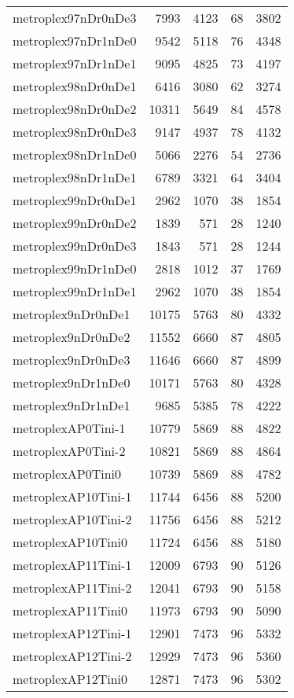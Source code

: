 \begin{longtable}{lrrrr}
metroplex97nDr0nDe3 & 7993 & 4123 & 68 & 3802 \\
metroplex97nDr1nDe0 & 9542 & 5118 & 76 & 4348 \\
metroplex97nDr1nDe1 & 9095 & 4825 & 73 & 4197 \\
metroplex98nDr0nDe1 & 6416 & 3080 & 62 & 3274 \\
metroplex98nDr0nDe2 & 10311 & 5649 & 84 & 4578 \\
metroplex98nDr0nDe3 & 9147 & 4937 & 78 & 4132 \\
metroplex98nDr1nDe0 & 5066 & 2276 & 54 & 2736 \\
metroplex98nDr1nDe1 & 6789 & 3321 & 64 & 3404 \\
metroplex99nDr0nDe1 & 2962 & 1070 & 38 & 1854 \\
metroplex99nDr0nDe2 & 1839 & 571 & 28 & 1240 \\
metroplex99nDr0nDe3 & 1843 & 571 & 28 & 1244 \\
metroplex99nDr1nDe0 & 2818 & 1012 & 37 & 1769 \\
metroplex99nDr1nDe1 & 2962 & 1070 & 38 & 1854 \\
metroplex9nDr0nDe1 & 10175 & 5763 & 80 & 4332 \\
metroplex9nDr0nDe2 & 11552 & 6660 & 87 & 4805 \\
metroplex9nDr0nDe3 & 11646 & 6660 & 87 & 4899 \\
metroplex9nDr1nDe0 & 10171 & 5763 & 80 & 4328 \\
metroplex9nDr1nDe1 & 9685 & 5385 & 78 & 4222 \\
metroplexAP0Tini-1 & 10779 & 5869 & 88 & 4822 \\
metroplexAP0Tini-2 & 10821 & 5869 & 88 & 4864 \\
metroplexAP0Tini0 & 10739 & 5869 & 88 & 4782 \\
metroplexAP10Tini-1 & 11744 & 6456 & 88 & 5200 \\
metroplexAP10Tini-2 & 11756 & 6456 & 88 & 5212 \\
metroplexAP10Tini0 & 11724 & 6456 & 88 & 5180 \\
metroplexAP11Tini-1 & 12009 & 6793 & 90 & 5126 \\
metroplexAP11Tini-2 & 12041 & 6793 & 90 & 5158 \\
metroplexAP11Tini0 & 11973 & 6793 & 90 & 5090 \\
metroplexAP12Tini-1 & 12901 & 7473 & 96 & 5332 \\
metroplexAP12Tini-2 & 12929 & 7473 & 96 & 5360 \\
metroplexAP12Tini0 & 12871 & 7473 & 96 & 5302 \\

\end{longtable}
